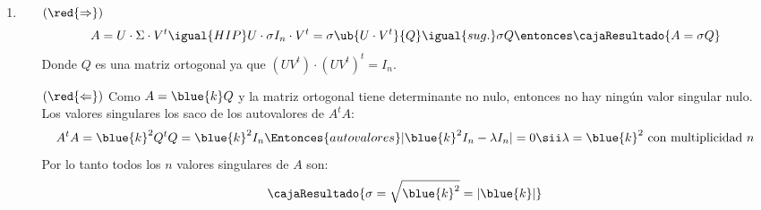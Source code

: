 \begin{enumerate}[label=\alph*)]
  \item
        \begin{itemize}
          \item[$(\red{\Rightarrow})$]
                $$
                  A = U \cdot \Sigma \cdot V^t
                  \igual{HIP} U  \cdot \sigma I_n \cdot V^t
                  = \sigma \ub{U \cdot V^t}{Q}
                  \igual{sug.} \sigma Q
                  \entonces
                  \cajaResultado{
                    A = \sigma Q
                  }
                $$
                Donde $Q$ es una matriz ortogonal ya que $(U  V^t ) \cdot (U  V^t)^t = I_n$.

          \item[$(\red{\Leftarrow})$] Como $A = \blue{k} Q$ y la matriz ortogonal tiene determinante no nulo,
                entonces no hay ningún valor singular nulo. Los valores singulares los saco de los
                autovalores de $A^tA$:
                $$
                  A^tA = \blue{k}^2Q^tQ = \blue{k}^2 I_n
                  \Entonces{autovalores}
                  |\blue{k}^2 I_n - \lambda I_n| = 0
                  \sii
                  \lambda = \blue{k}^2 \text{ con multiplicidad } n
                $$
                Por lo tanto todos los $n$ valores singulares de $A$ son:
                $$
                  \cajaResultado{
                    \sigma = \sqrt{\blue{k}^2} = |\blue{k}|
                  }
                $$
        \end{itemize}


\end{enumerate}
